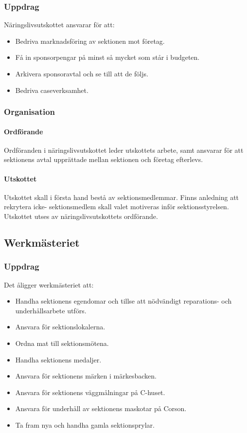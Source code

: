 \documentclass{datateknologsektionen-document}
\begin{document}
\subsubsection{Uppdrag}
Näringslivsutskottet ansvarar för att:
\begin{itemize}
  \item Bedriva marknadsföring av sektionen mot företag.
  \item Få in sponsorpengar på minst så mycket som står i budgeten.
  \item Arkivera sponsoravtal och se till att de följs.
  \item Bedriva caseverksamhet.
\end{itemize}
\subsubsection{Organisation}
\paragraph{Ordförande}
Ordföranden i näringslivsutskottet leder utskottets arbete, samt ansvarar för att sektionens
avtal upprättade mellan sektionen och företag efterlevs.
\paragraph{Utskottet}

Utskottet skall i första hand bestå av sektionsmedlemmar. Finns anledning att rekrytera icke-
sektionsmedlem skall valet motiveras inför sektionsstyrelsen. Utskottet utses av
näringslivsutskottets ordförande.

\subsection{Werkmästeriet}
\label{werk}
\subsubsection{Uppdrag}
Det åligger werkmästeriet att:
\begin{itemize}
  \item Handha sektionens egendomar och tillse att nödvändigt reparations- och underhållsarbete utförs.
  \item Ansvara för sektionslokalerna.
  \item Ordna mat till sektionsmötena.
  \item Handha sektionens medaljer.
  \item Ansvara för sektionens märken i märkesbacken.
  \item Ansvara för sektionens väggmålningar på C-huset.
  \item Ansvara för underhåll av sektionens maskotar på Corson.
  \item Ta fram nya och handha gamla sektionsprylar.
\end{itemize}
\end{document}
